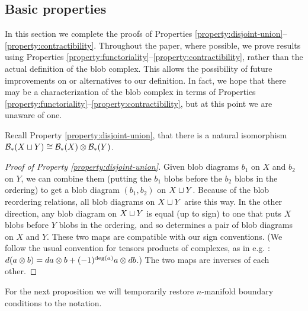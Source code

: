 
\subsection{Basic properties}
\label{sec:basic-properties}

In this section we complete the proofs of Properties \ref{property:disjoint-union}--\ref{property:contractibility}.
Throughout the paper, where possible, we prove results using Properties \ref{property:functoriality}--\ref{property:contractibility}, 
rather than the actual definition of the blob complex.
This allows the possibility of future improvements on or alternatives to our definition.
In fact, we hope that there may be a characterization of the blob complex in 
terms of Properties \ref{property:functoriality}--\ref{property:contractibility}, but at this point we are unaware of one.

Recall Property \ref{property:disjoint-union}, 
that there is a natural isomorphism ${\mathcal B}_*(X \sqcup Y) \cong {\mathcal B}_*(X) \otimes {\mathcal B}_*(Y)$.

\begin{proof}[Proof of Property \ref{property:disjoint-union}]
Given blob diagrams $b_1$ on $X$ and $b_2$ on $Y$, we can combine them
(putting the $b_1$ blobs before the $b_2$ blobs in the ordering) to get a
blob diagram $(b_1, b_2)$ on $X \sqcup Y$.
Because of the blob reordering relations, all blob diagrams on $X \sqcup Y$ arise this way.
In the other direction, any blob diagram on $X\sqcup Y$ is equal (up to sign)
to one that puts $X$ blobs before $Y$ blobs in the ordering, and so determines
a pair of blob diagrams on $X$ and $Y$.
These two maps are compatible with our sign conventions.
(We follow the usual convention for tensors products of complexes, 
as in e.g. \cite{MR1438306}: $d(a \otimes b) = da \otimes b + (-1)^{\deg(a)} a \otimes db$.)
The two maps are inverses of each other.
\end{proof}

For the next proposition we will temporarily restore $n$-manifold boundary
conditions to the notation.

